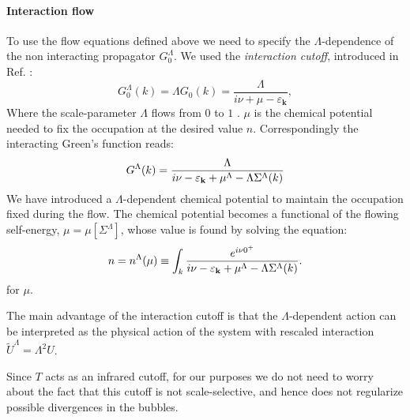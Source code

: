 \paragraph*{Interaction flow}
To use the flow equations defined above we need to specify the $\Lambda$-dependence of the non interacting propagator $G_0^\Lambda$.
We used the \textit{interaction cutoff}, introduced in Ref. :
 \begin{equation}
 G_0^\Lambda(k) = \Lambda G_0(k)=\frac{\Lambda}{i\nu+\mu-\varepsilon_{\mathbf{k}} } , 
 \end{equation}
  Where the scale-parameter $\Lambda$ flows from $0$ to $1$%
. $\mu$ is the chemical potential needed to fix the occupation at the desired value $n$. Correspondingly the interacting Green's function reads: 
\begin{equation}
G^\Lambda (k) = \frac{\Lambda}{i\nu - \varepsilon_{\mathbf{k}} +\mu^{\Lambda}-\Lambda\Sigma^\Lambda(k)} 
\end{equation} 
We have introduced a $\Lambda$-dependent chemical potential to maintain the occupation fixed during the flow. The chemical potential becomes a functional of the flowing self-energy, $\mu=\mu[\Sigma^\Lambda]$, whose value is found by solving the equation:  
\begin{equation}
n = n^{\Lambda}(\mu) \equiv \int_k \frac{e^{i\nu 0^{+}}} {i\nu - \varepsilon_{\mathbf{k}} +\mu^{\Lambda}-\Lambda\Sigma^\Lambda(k)}. 
\end{equation} 
for $\mu$.  

The main advantage of the interaction cutoff is that  the $\Lambda$-dependent action can be interpreted\cite{Honerkamp2004} as the physical action of the system with rescaled interaction $\tilde{U}^\Lambda = \Lambda^2 U$.

Since $T$ acts as an infrared cutoff, for our purposes we do not need to worry about the fact that this cutoff is not scale-selective, and hence does not regularize possible divergences in the bubbles. 



   
